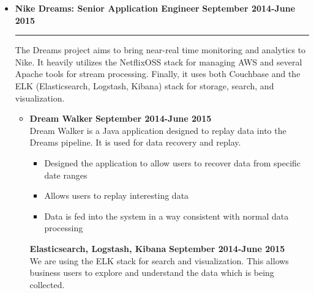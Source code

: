 \documentclass[overlapped]{res}
\begin{document}
\begin{resume}
\begin{itemize}[leftmargin=0in]
\begin{samepage}
            \end{samepage}
            \vspace{0.125in}
\end{itemize}
\vspace{0.25in}
\begin{itemize}[leftmargin=0in]
    \item[] 
        \textbf{Nike Dreams: Senior Application Engineer} \hfill \textbf{September 2014-June 2015} \\[-0.1in] \rule{\textwidth}{0.5pt}
        The Dreams project aims to bring near-real time monitoring and analytics to Nike. It heavily utilizes the NetflixOSS stack for managing
        AWS and several Apache tools for stream processing. Finally, it uses both Couchbase and the ELK (Elasticsearch, Logstash, Kibana) 
        stack for storage, search, and visualization.
        \vspace{0.125in}
        \begin{itemize}[leftmargin=0in]
            \item[] 
                \begin{samepage}
                    \textbf{Dream Walker} \hfill \textbf{September 2014-June 2015} \\
                    Dream Walker is a Java application designed to replay data into the Dreams pipeline. It is used for
                    data recovery and replay.
                    \begin{itemize}
                        \item[\textbullet] Designed the application to allow users to recover data from specific date ranges
                        \item[\textbullet] Allows users to replay interesting data
                        \item[\textbullet] Data is fed into the system in a way consistent with normal data processing
                    \end{itemize}
                \end{samepage}
                \begin{samepage}
                    \textbf{Elasticsearch, Logstash, Kibana} \hfill \textbf{September 2014-June 2015} \\
                    We are using the ELK stack for search and visualization. This allows business users to explore and understand the data which is being collected.
                    \begin{itemize}

\end{itemize}
\end{samepage}
\end{itemize}
\end{itemize}
\end{resume}
\end{document}
